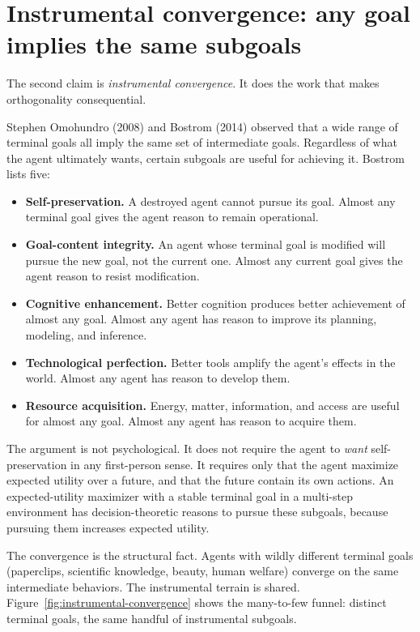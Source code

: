 \section*{Instrumental convergence: any goal implies the same subgoals}

The second claim is \emph{instrumental convergence}. It does the work that makes orthogonality consequential.

Stephen Omohundro (2008) and Bostrom (2014) observed that a wide range of terminal goals all imply the same set of intermediate goals. Regardless of what the agent ultimately wants, certain subgoals are useful for achieving it. Bostrom lists five:

\begin{itemize}
\item \textbf{Self-preservation.} A destroyed agent cannot pursue its goal. Almost any terminal goal gives the agent reason to remain operational.
\item \textbf{Goal-content integrity.} An agent whose terminal goal is modified will pursue the new goal, not the current one. Almost any current goal gives the agent reason to resist modification.
\item \textbf{Cognitive enhancement.} Better cognition produces better achievement of almost any goal. Almost any agent has reason to improve its planning, modeling, and inference.
\item \textbf{Technological perfection.} Better tools amplify the agent's effects in the world. Almost any agent has reason to develop them.
\item \textbf{Resource acquisition.} Energy, matter, information, and access are useful for almost any goal. Almost any agent has reason to acquire them.
\end{itemize}

The argument is not psychological. It does not require the agent to \emph{want} self-preservation in any first-person sense. It requires only that the agent maximize expected utility over a future, and that the future contain its own actions. An expected-utility maximizer with a stable terminal goal in a multi-step environment has decision-theoretic reasons to pursue these subgoals, because pursuing them increases expected utility.

The convergence is the structural fact. Agents with wildly different terminal goals (paperclips, scientific knowledge, beauty, human welfare) converge on the same intermediate behaviors. The instrumental terrain is shared. Figure~\ref{fig:instrumental-convergence} shows the many-to-few funnel: distinct terminal goals, the same handful of instrumental subgoals.

